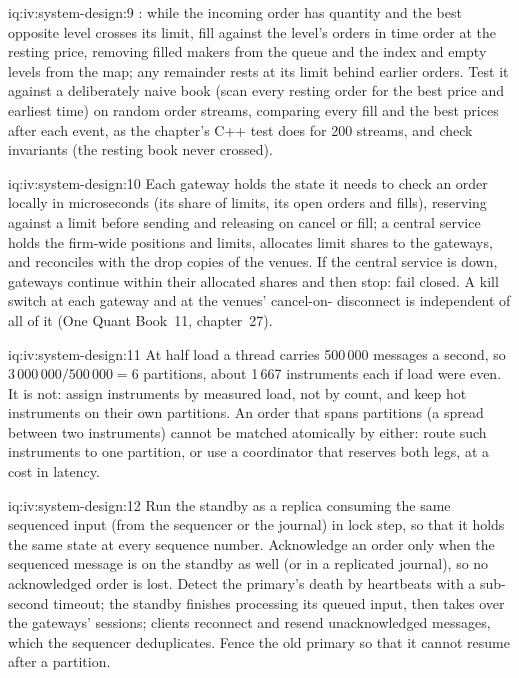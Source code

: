 \begin{solution}{iq:iv:system-design:9}
: while the incoming order has quantity and the best opposite level crosses its limit, fill against the
level's orders in time order at the resting price, removing filled makers from the queue and the index and empty levels from the
map; any remainder rests at its limit behind earlier orders. Test it against a deliberately naive book (scan every resting order for
the best price and earliest time) on random order streams, comparing every fill and the best prices after each event, as the chapter's
C++ test does for 200 streams, and check invariants (the resting book never crossed).
\end{solution}

\begin{solution}{iq:iv:system-design:10}
Each gateway holds the state it needs to check an order locally in microseconds (its share of limits, its open orders and fills),
reserving against a limit before sending and releasing on cancel or fill; a central service holds the firm-wide positions and
limits, allocates limit shares to the gateways, and reconciles with the drop copies of the venues. If the central service is down,
gateways continue within their allocated shares and then stop: fail closed. A kill switch at each gateway and at the venues' cancel-on-
disconnect is independent of all of it (One Quant Book~11, chapter~27).
\end{solution}

\begin{solution}{iq:iv:system-design:11}
At half load a thread carries 500\,000 messages a second, so $3\,000\,000/500\,000 = 6$ partitions, about 1\,667 instruments each if
load were even. It is not: assign instruments by measured load, not by count, and keep hot instruments on their own partitions. An
order that spans partitions (a spread between two instruments) cannot be matched atomically by either: route such instruments to one
partition, or use a coordinator that reserves both legs, at a cost in latency.
\end{solution}

\begin{solution}{iq:iv:system-design:12}
Run the standby as a replica consuming the same sequenced input (from the sequencer or the journal) in lock step, so that it holds
the same state at every sequence number. Acknowledge an order only when the sequenced message is on the standby as well (or in a
replicated journal), so no acknowledged order is lost. Detect the primary's death by heartbeats with a sub-second timeout; the standby
finishes processing its queued input, then takes over the gateways' sessions; clients reconnect and resend unacknowledged messages,
which the sequencer deduplicates. Fence the old primary so that it cannot resume after a partition.
\end{solution}

